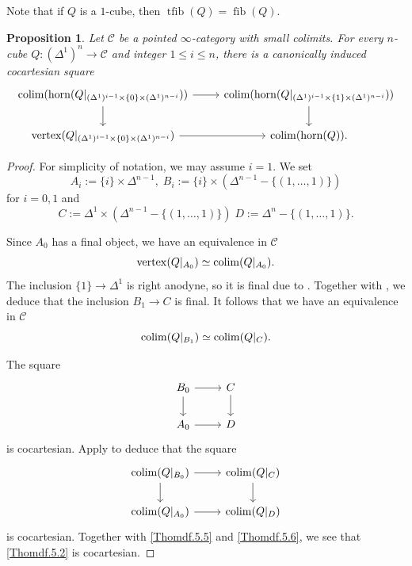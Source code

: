 \documentclass[11pt, a4paper]{amsart}
\newtheorem{prop}[thm]{Proposition}
\theoremstyle{definition}
\numberwithin{equation}{subsection}
\newcommand{\colimit}{\mathop{\rm colim}}
\newcommand{\cC}{\mathcal{C}}
\newcommand{\tfib}{\operatorname{tfib}}
\newcommand{\fib}{\operatorname{fib}}
\newcommand{\horn}{\mathrm{horn}}
\newcommand{\vertex}{\mathrm{vertex}}
\begin{document}
Note that if $Q$ is a $1$-cube, then $\tfib(Q)=\fib(Q)$.

\begin{prop}
\label{Thomdf.5}
Let $\cC$ be a pointed $\infty$-category with small colimits.
For every $n$-cube $Q\colon (\Delta^1)^n\to \cC$ and integer $1\leq i\leq n$, 
there is a canonically induced cocartesian square
\begin{equation}
\label{Thomdf.5.2}
\begin{tikzcd}
\colimit(\horn(Q|_{(\Delta^1)^{i-1}\times \{0\}\times (\Delta^1)^{n-i}}))\ar[d]\ar[r]&
\colimit(\horn(Q|_{(\Delta^1)^{i-1}\times \{1\}\times (\Delta^1)^{n-i}}))\ar[d]
\\
\vertex(Q|_{(\Delta^1)^{i-1}\times \{0\}\times (\Delta^1)^{n-i}})\ar[r]&
\colimit(\horn(Q)).
\end{tikzcd}
\end{equation}
\end{prop}
\begin{proof}
For simplicity of notation, we may assume $i=1$.
We set
\[
A_i:=\{i\}\times \Delta^{n-1},
\;
B_i:=\{i\}\times (\Delta^{n-1}-\{(1,\ldots,1)\})
\]
for $i=0,1$ and
\[
C:=\Delta^1\times (\Delta^{n-1}-\{(1,\ldots,1)\})
\;
D:=\Delta^{n}-\{(1,\ldots,1)\}.
\]

Since $A_0$ has a final object, we have an equivalence in $\cC$
\begin{equation}
\label{Thomdf.5.5}
\vertex(Q|_{A_0})
\simeq
\colimit(Q|_{A_0}).
\end{equation}
The inclusion $\{1\} \to \Delta^1$ is right anodyne, so it is final due to \cite[Corollary 4.1.1.12]{HTT}.
Together with \cite[Corollary 4.1.2.7]{HTT}, we deduce that the inclusion $B_1\to C$ is final.
It follows that we have an equivalence in $\cC$
\begin{equation}
\label{Thomdf.5.6}
\colimit(Q|_{B_1})
\simeq
\colimit(Q|_{C}).
\end{equation}

The square
\[
\begin{tikzcd}
B_0\ar[r]\ar[d]&
C\ar[d]
\\
A_0\ar[r]&
D
\end{tikzcd}
\]
is cocartesian.
Apply \cite[Proposition 4.4.2.2]{HTT} to deduce that the square
\begin{equation}
\label{Thomdf.5.4}
\begin{tikzcd}
\colimit(Q|_{B_0})\ar[d]\ar[r]&
\colimit(Q|_{C})\ar[d]
\\
\colimit(Q|_{A_0})\ar[r]&
\colimit(Q|_D)
\end{tikzcd}
\end{equation}
is cocartesian.
Together with \eqref{Thomdf.5.5} and \eqref{Thomdf.5.6}, we see that \eqref{Thomdf.5.2} is cocartesian.
\end{proof}
\end{document}
